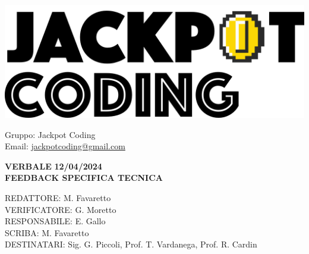 \documentclass[5pt]{article}
\begin{document}
\begin{minipage}[t]{0.50\textwidth}
    \begin{flushleft}
        \hspace{10pt}
        \includegraphics[scale=0.65]{jackpot-logo.png} 
    \end{flushleft}
\end{minipage}
\hspace{-60pt} %
\begin{flushright}
    \begin{minipage}[t]{0.50\textwidth}
        \begin{flushright}
            Gruppo: {\Large Jackpot Coding}\\
            Email: \href{mailto:jackpotcoding@gmail.com}{jackpotcoding@gmail.com}
        \end{flushright}
    \end{minipage}
\end{flushright}

\vspace{20pt}

\begin{center}
    \textbf{\large VERBALE }
    \textbf{\large 12/04/2024} \\
    \textbf{\LARGE  FEEDBACK SPECIFICA TECNICA}
\end{center}

\vspace{13pt}

\begin{flushleft}
    \begin{spacing}{1.5}
        REDATTORE: M. Favaretto\\ 
        VERIFICATORE: G. Moretto\\ 
        RESPONSABILE: E. Gallo\\ 
        \vspace{7pt}
        SCRIBA: M. Favaretto\\ 
        \vspace{7pt}
        DESTINATARI: Sig. G. Piccoli, Prof. T. Vardanega, Prof. R. Cardin\\ 
    \end{spacing}
\end{flushleft}
\end{document}
